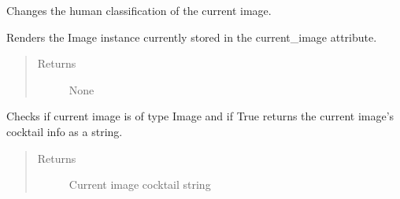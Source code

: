 \documentclass[letterpaper,10pt,english]{sphinxmanual}
\begin{document}
\begin{fulllineitems}

\begin{fulllineitems}
\label{\detokenize{polo.widgets:polo.widgets.slideshow_viewer.SlideshowViewer.classify_current_image}}
Changes the human classification of the current image.

\end{fulllineitems}


\begin{fulllineitems}
\label{\detokenize{polo.widgets:polo.widgets.slideshow_viewer.SlideshowViewer.display_current_image}}
Renders the Image instance currently stored in the current\_image            attribute.
\begin{quote}\begin{description}
\item[{Returns}] \leavevmode
None

\end{description}\end{quote}

\end{fulllineitems}


\begin{fulllineitems}
\label{\detokenize{polo.widgets:polo.widgets.slideshow_viewer.SlideshowViewer.get_cur_img_cocktail_str}}
Checks if current image is of type Image and if True returns            the current image’s cocktail info as a string.
\begin{quote}\begin{description}
\item[{Returns}] \leavevmode
Current image cocktail string


\end{description}
\end{quote}
\end{fulllineitems}
\end{fulllineitems}
\end{document}
